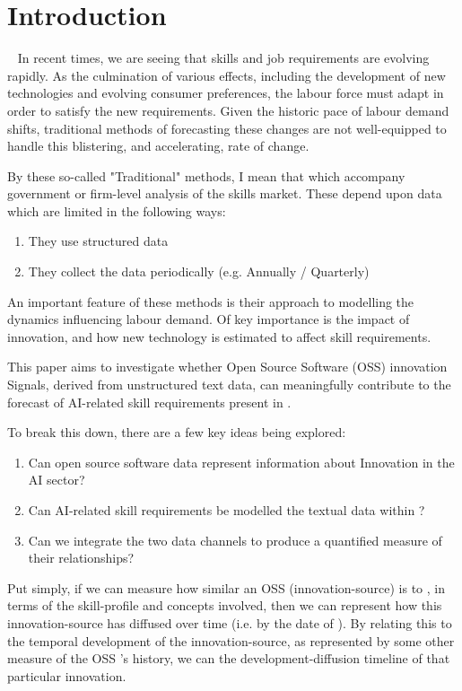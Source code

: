 \chapter{Introduction}
~\textcolor{red}{\cite{TODO}}
In recent times, we are seeing that skills and job requirements are evolving rapidly.
As the culmination of various effects, including the development of new technologies and evolving consumer preferences, the labour force must adapt in order to satisfy the new requirements.
Given the historic pace of labour demand shifts, traditional methods of forecasting these changes are not well-equipped to handle this blistering, and accelerating, rate of change.

By these so-called "Traditional" methods, I mean that which accompany government or firm-level analysis of the skills market. These depend upon data which are limited in the following ways:

\begin{enumerate}
  \item They use structured data
  \item They collect the data periodically (e.g. Annually / Quarterly)
\end{enumerate}

An important feature of these methods is their approach to modelling the dynamics influencing labour demand.
Of key importance is the impact of innovation, and how new technology is estimated to affect skill requirements.

This paper aims to investigate whether Open Source Software (OSS) innovation Signals, derived from unstructured text data, can meaningfully contribute to the forecast of AI-related skill requirements present in \jobposts{}.

To break this down, there are a few key ideas being explored:
\begin{enumerate}
  \item Can open source software data represent information about Innovation in the AI sector?
  \item Can AI-related skill requirements be modelled the textual data within \jobposts{}?
  \item Can we integrate the two data channels to produce a quantified measure of their relationships?
\end{enumerate}

Put simply, if we can measure how similar an OSS \repo{} (innovation-source) is to \jobposts{}, in terms of the skill-profile and concepts involved, then we can represent how this innovation-source has diffused over time (i.e. by the date of \jobpost{}).
By relating this to the temporal development of the innovation-source, as represented by some other measure of the OSS \repo{}'s history, we can the development-diffusion timeline of that particular innovation.

